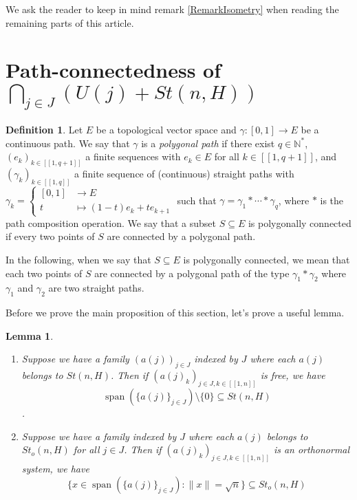 \documentclass[a4paper,12pt]{article}
\DeclareMathOperator{\Span}{span}
\theoremstyle{plain}
\newtheorem{lemma}{Lemma}[section]
\theoremstyle{definition}
\newtheorem{definition}{Definition}[section]
\theoremstyle{remark}
\begin{document}
We ask the reader to keep in mind remark \ref{RemarkIsometry} when reading the remaining parts of this article.










\section{Path-connectedness of $\bigcap_{j \in J} \left( U(j) + St(n,H) \right)$}
\label{SectionPathConnectedness}

\begin{definition}
Let $E$ be a topological vector space and $\gamma : [0,1] \to E$ be a continuous path. We say that $\gamma$ is a \textit{polygonal path} if there exist $q \in \mathbb{N}^*$, $(e_k)_{k \in [\![1,q+1]\!]}$ a finite sequences with $e_k \in E$ for all $k \in [\![1,q+1]\!]$, and $(\gamma_k)_{k \in [\![1,q]\!]}$ a finite sequence of (continuous) straight paths with $\gamma_k = \begin{cases} [0,1] &\to E \\ t &\mapsto (1-t)e_k + te_{k+1} \end{cases}$ such that $\gamma = \gamma_1 * \cdots * \gamma_q$, where $*$ is the path composition operation. We say that a subset $S \subseteq E$ is polygonally connected if every two points of $S$ are connected by a polygonal path. 
\end{definition}

In the following, when we say that $S \subseteq E$ is polygonally connected, we mean that each two points of $S$ are connected by a polygonal path of the type $\gamma_1 * \gamma_2$ where $\gamma_1$ and $\gamma_2$ are two straight paths.

Before we prove the main proposition of this section, let's prove a useful lemma.

\begin{lemma}
\label{LemmaSpanFrames}
\begin{enumerate}
\item Suppose we have a family $(a(j))_{j \in J}$ indexed by $J$ where each $a(j)$ belongs to $St(n,H)$. Then if $(a(j)_k)_{j \in J, k \in [\![1,n]\!]}$ is free, we have
\[ \Span( \{a(j)\}_{j \in J} ) \setminus \{0\} \subseteq St(n,H) \].
\item Suppose we have a family indexed by $J$ where each $a(j)$ belongs to $St_o(n,H)$ for all $j \in J$. Then if $(a(j)_k)_{j \in J, k \in [\![1,n]\!]}$ is an orthonormal system, we have
\[ \{ x \in \Span( \{a(j)\}_{j \in J} ) : \| x \| = \sqrt{n} \} \subseteq St_o(n,H) \]
\end{enumerate}
\end{lemma}
\end{document}
